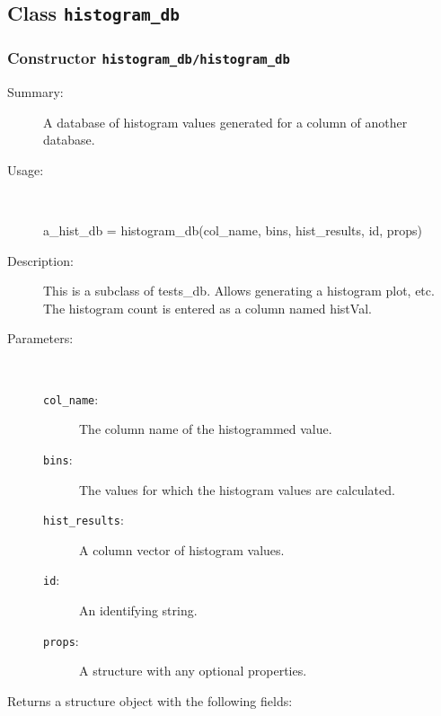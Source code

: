 \subsection{Class \texttt{histogram\_db}}%
%
\label{ref_histogram_db}%
\hypertarget{ref_histogram_db}{}%
\subsubsection[Constructor \texttt{histogram\_db}]{Constructor \texttt{histogram\_db/histogram\_db}}%
%
\label{ref_histogram_db__histogram_db}%
\hypertarget{ref_histogram_db__histogram_db}{}%
\begin{description}
\item[Summary:]A database of histogram values generated for a column of another database.
%
\item[Usage:]~%
\begin{lyxcode}%
a\_hist\_db = histogram\_db(col\_name, bins, hist\_results, id, props)
%
\end{lyxcode}%
%
\item[Description:]%
This is a subclass of tests\_db. Allows generating a histogram plot,
 etc. The histogram count is entered as a column named histVal.
\item[Parameters:]~
\begin{description}%
\item[\texttt{col\_name}:]
 The column name of the histogrammed value.
\item[\texttt{bins}:]
 The values for which the histogram values are calculated.
\item[\texttt{hist\_results}:]
 A column vector of histogram values.
\item[\texttt{id}:]
 An identifying string.
\item[\texttt{props}:]
 A structure with any optional properties.
\end{description}%
%
\item[Returns a structure object with the following fields:
]~


\end{description}

